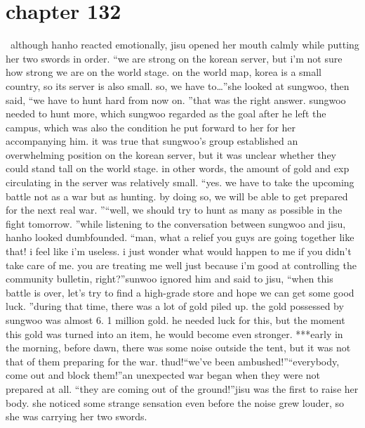 \section{chapter 132}






 although hanho reacted emotionally, jisu opened her mouth calmly while putting her two swords in order.
“we are strong on the korean server, but i’m not sure how strong we are on the world stage.
 on the world map, korea is a small country, so its server is also small.
 so, we have to…”she looked at sungwoo, then said, “we have to hunt hard from now on.
”that was the right answer.
 sungwoo needed to hunt more, which sungwoo regarded as the goal after he left the campus, which was also the condition he put forward to her for her accompanying him.
it was true that sungwoo’s group established an overwhelming position on the korean server, but it was unclear whether they could stand tall on the world stage.
 in other words, the amount of gold and exp circulating in the server was relatively small.
“yes.
 we have to take the upcoming battle not as a war but as hunting.
 by doing so, we will be able to get prepared for the next real war.
”“well, we should try to hunt as many as possible in the fight tomorrow.
”while listening to the conversation between sungwoo and jisu, hanho looked dumbfounded.
“man, what a relief you guys are going together like that! i feel like i’m useless.
 i just wonder what would happen to me if you didn’t take care of me.
 you are treating me well just because i’m good at controlling the community bulletin, right?”sunwoo ignored him and said to jisu, “when this battle is over, let’s try to find a high-grade store and hope we can get some good luck.
”during that time, there was a lot of gold piled up.
 the gold possessed by sungwoo was almost 6.
1 million gold.
 he needed luck for this, but the moment this gold was turned into an item, he would become even stronger.
***early in the morning, before dawn, there was some noise outside the tent, but it was not that of them preparing for the war.
thud!“we’ve been ambushed!”“everybody, come out and block them!”an unexpected war began when they were not prepared at all.
“they are coming out of the ground!”jisu was the first to raise her body.
 she noticed some strange sensation even before the noise grew louder, so she was carrying her two swords.

